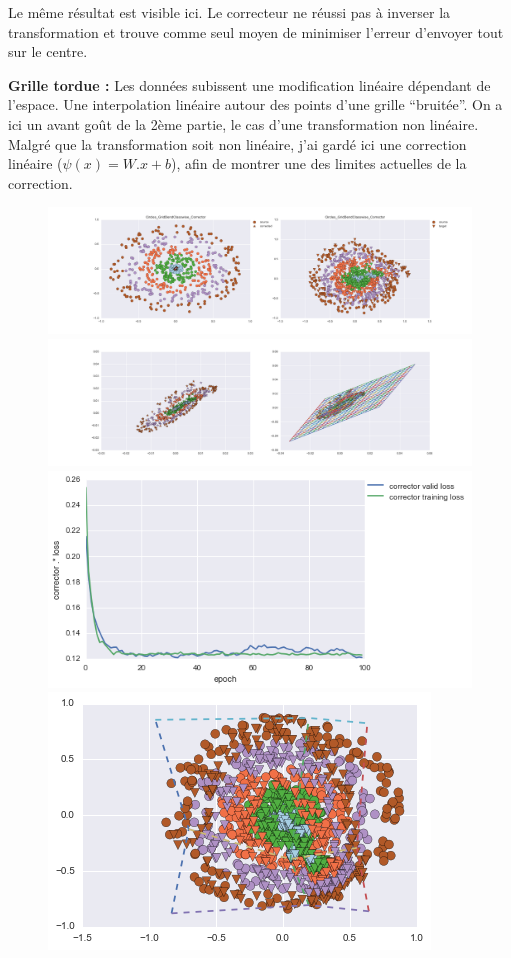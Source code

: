 Le même résultat est visible ici. Le correcteur ne réussi pas à inverser la transformation 
et trouve comme seul moyen de minimiser l'erreur d'envoyer tout sur le centre.

{\Large \textbf{Grille tordue :}} Les données subissent une modification linéaire dépendant de l'espace.
Une interpolation linéaire autour des points d'une grille ``bruitée''.
On a ici un avant goût de la 2ème partie, le cas d'une transformation non linéaire.
Malgré que la transformation soit non linéaire, j'ai gardé ici une correction linéaire ($\psi(x) = W.x+b$),
afin de montrer une des limites actuelles de la correction.

\begin{figure}[H] %
\centering
\includegraphics[width=\linewidth]{fig/24-05-2016/circles/Circles_GridBendClasswise_Corrector-DATA.png}
\includegraphics[width=\linewidth]{fig/24-05-2016/circles/Circles_GridBendClasswise_Corrector-GridCheck.png}
\includegraphics[width=0.45\linewidth]{fig/24-05-2016/circles/Circles_GridBendClasswise_Corrector-Learning_curve.png}
\includegraphics[width=0.45\linewidth]{fig/24-05-2016/circles/circles_grid.png}

\end{figure}
